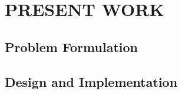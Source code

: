 \chapter{PRESENT WORK} \vspace{-15 mm} \hrulefill
\label{Chapter:3}


\section{Problem Formulation}

\section{Design and Implementation}

